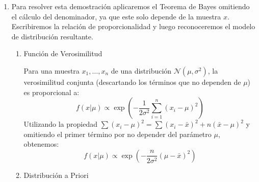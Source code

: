 \begin{enumerate}[label=\color{red}\textbf{\arabic*)}]
	      Reconocemos en la expresión resultante el núcleo de la nueva \textbf{distribución Gamma}. Al comparar con la forma general $\lambda^{k-1}e^{-\lambda / \theta} $ (donde $k$ es la forma y $\theta$ es la escala), identificamos los nuevos parámetros:
	      \begin{itemize}[label=\textbullet]
		      \item \textbf{Parámetro de forma actualizado:} $\alpha'=\alpha+n\bar{x}=\alpha+\sum_{i=1}^{n} x_{i}$
		      \item \textbf{Parámetro de escala actualizado:} $\beta'=\dfrac{1}{n+1 / \beta}=\dfrac{\beta}{n\beta+1}$
	      \end{itemize}
	      Por lo tanto, la distribución a posteriori es: \[
		      \lambda|x\sim \mathrm{Gamma}\left( \alpha+\sum_{i=1}^{n} x_{i},\dfrac{\beta}{n\beta+1} \right)
	      \]
	\item {}
	      Para resolver esta demostración aplicaremos el Teorema de Bayes omitiendo el cálculo del denominador, ya que este solo depende de la muestra $x$. Escribiremos la relación de proporcionalidad y luego reconoceremos el modelo de distribución resultante.

	      \begin{enumerate}[label=\arabic*)]
		      \item Función de Verosimilitud

		            Para una muestra $x_1,\dots,x_n$ de una distribución $\mathcal{N}(\mu,\sigma^2)$, la verosimilitud conjunta (descartando los términos que no dependen de $\mu$) es proporcional a: \[
			            f(x|\mu)\propto \exp \left( -\dfrac{1}{2\sigma^2}\sum_{i=1}^{n} (x_{i}-\mu)^2 \right)
		            \]
		            Utilizando la propiedad $\sum(x_{i}-\mu)^2=\sum(x_{i}-\bar{x})^2+n(\bar{x}-\mu)^2$ y omitiendo el primer término por no depender del parámetro $\mu$, obtenemos: \[
			            f(x|\mu)\propto \exp \left( -\dfrac{n}{2\sigma^2}(\mu-\bar{x})^2 \right)
		            \]
		      \item Distribución a Priori


\end{enumerate}
\end{enumerate}

